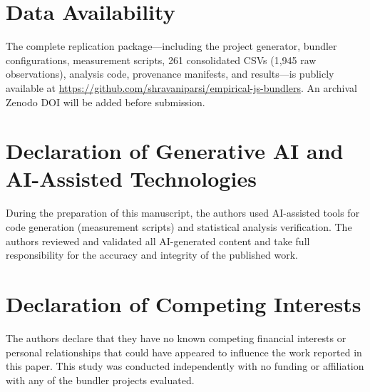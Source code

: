 \documentclass[preprint,12pt]{elsarticle}
\begin{document}
\section*{Data Availability}
The complete replication package---including the project generator, bundler configurations, measurement scripts, 261 consolidated CSVs (1{,}945 raw observations), analysis code, provenance manifests, and results---is publicly available at \url{https://github.com/shravaniparsi/empirical-js-bundlers}. An archival Zenodo DOI will be added before submission.

\section*{Declaration of Generative AI and AI-Assisted Technologies}
During the preparation of this manuscript, the authors used AI-assisted tools for code generation (measurement scripts) and statistical analysis verification.
The authors reviewed and validated all AI-generated content and take full responsibility for the accuracy and integrity of the published work.

\section*{Declaration of Competing Interests}
The authors declare that they have no known competing financial interests or personal relationships that could have appeared to influence the work reported in this paper.
This study was conducted independently with no funding or affiliation with any of the bundler projects evaluated.



\end{document}
